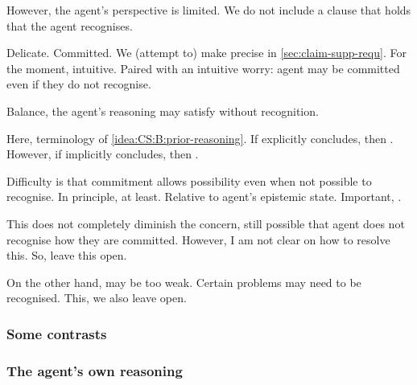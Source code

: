 \begin{note}
  However, the agent's perspective is limited.
  We do not include a clause that holds that the agent recognises.

  Delicate.
  Committed.
  We (attempt to) make precise in \autoref{sec:claim-supp-requ}.
  For the moment, intuitive.
  Paired with an intuitive worry: agent may be committed even if they do not recognise.

  Balance, the agent's reasoning may satisfy without recognition.

  Here,  terminology of \ref{idea:CS:B:prior-reasoning}.
  If explicitly concludes, then .
  However, if implicitly concludes, then .

  Difficulty is that commitment allows possibility even when not possible to recognise.
  In principle, at least.
  Relative to agent's epistemic state.
  Important, \ep{}.

  This does not completely diminish the concern, still possible that agent does not recognise how they are committed.
  However, I am not clear on how to resolve this.
  So, leave this open.

  On the other hand,  may be too weak.
  Certain problems may need to be recognised.
  This, we also leave open.
\end{note}

\subsubsection{Some contrasts}
\label{sec:some-contrasts}


\subsubsection{The agent's own reasoning}
\label{sec:agents-own-reasoning}

